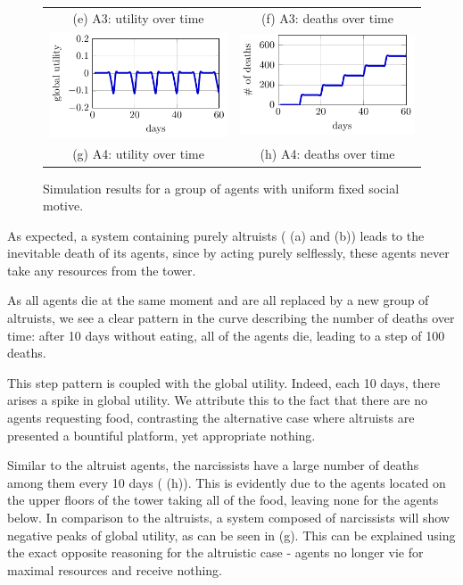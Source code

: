 \begin{figure}[htb]
\begin{tabular}{cc}
    (e) A3: utility over time & (f) A3: deaths over time
    \\[8pt]
     \includegraphics[width=0.3\linewidth]{008_team_6_agent_design/A/SOMAS_A4_utility.pdf} &   \includegraphics[width=0.3\linewidth]{008_team_6_agent_design/A/SOMAS_A4_deaths.pdf} \\[0pt]
    (g) A4: utility over time & (h) A4: deaths over time
    \end{tabular}
    \caption{Simulation results for a group of agents with uniform fixed social motive.}
    \label{fig:res_A}%
\end{figure}



As expected, a system containing purely altruists ( (a) and (b)) leads to the inevitable death of its agents, since by acting purely selflessly, these agents never take any resources from the tower.

As all agents die at the same moment and are all replaced by a new group of altruists, we see a clear pattern in the curve describing the number of deaths over time: after 10 days without eating, all of the agents die, leading to a step of 100 deaths. 

This step pattern is coupled with the global utility. Indeed, each 10 days, there arises a spike in global utility. We attribute this to the fact that there are no agents requesting food, contrasting the alternative case where altruists are presented a bountiful platform, yet appropriate nothing. 

Similar to the altruist agents, the narcissists have a large number of deaths among them every 10 days ( (h)). This is evidently due to the agents located on the upper floors of the tower taking all of the food, leaving none for the agents below. In comparison to the altruists, a system composed of narcissists will show negative peaks of global utility, as can be seen in  (g). This can be explained using the exact opposite reasoning for the altruistic case - agents no longer vie for maximal resources and receive nothing.

